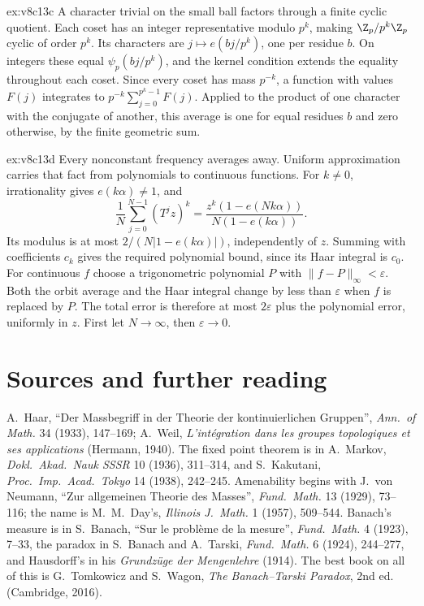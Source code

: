 \begin{solution}{ex:v8c13c}
\idea A character trivial on the small ball factors through a finite cyclic quotient.
\writeup Each coset has an integer representative modulo $p^k$, making $\Z_p/p^k\Z_p$ cyclic of order $p^k$. Its characters are $j\mapsto e(bj/p^k)$, one per residue $b$. On integers these equal $\psi_p(bj/p^k)$, and the kernel condition extends the equality throughout each coset. Since every coset has mass $p^{-k}$, a function with values $F(j)$ integrates to $p^{-k}\sum_{j=0}^{p^k-1}F(j)$. Applied to the product of one character with the conjugate of another, this average is one for equal residues $b$ and zero otherwise, by the finite geometric sum.
\end{solution}
\begin{solution}{ex:v8c13d}
\idea Every nonconstant frequency averages away. Uniform approximation carries that fact from polynomials to continuous functions.
\writeup For $k\ne0$, irrationality gives $e(k\alpha)\ne1$, and
\[\frac1N\sum_{j=0}^{N-1}(T^jz)^k
 =\frac{z^k(1-e(Nk\alpha))}{N(1-e(k\alpha))}.
\]
Its modulus is at most $2/(N|1-e(k\alpha)|)$, independently of $z$. Summing with coefficients $c_k$ gives the required polynomial bound, since its Haar integral is $c_0$. For continuous $f$ choose a trigonometric polynomial $P$ with $\|f-P\|_\infty<\varepsilon$. Both the orbit average and the Haar integral change by less than $\varepsilon$ when $f$ is replaced by $P$. The total error is therefore at most $2\varepsilon$ plus the polynomial error, uniformly in $z$. First let $N\to\infty$, then $\varepsilon\to0$.
\end{solution}

\section*{Sources and further reading}

A.~Haar, ``Der Massbegriff in der Theorie der kontinuierlichen Gruppen'', \emph{Ann.\ of Math.} 34 (1933), 147--169; A.~Weil, \emph{L'int\'egration dans les groupes topologiques
et ses applications} (Hermann, 1940). The fixed point theorem is in A.~Markov, \emph{Dokl.\ Akad.\ Nauk SSSR} 10 (1936), 311--314, and S.~Kakutani, \emph{Proc.\ Imp.\ Acad.\ Tokyo} 14
(1938), 242--245. Amenability begins with J.~von Neumann, ``Zur allgemeinen Theorie des Masses'', \emph{Fund.\ Math.} 13 (1929), 73--116; the name is M.~M.~Day's, \emph{Illinois J.\
Math.} 1 (1957), 509--544. Banach's measure is in S.~Banach, ``Sur le probl\`eme de la mesure'', \emph{Fund.\ Math.} 4 (1923), 7--33, the paradox in S.~Banach and A.~Tarski, \emph{Fund.\
Math.} 6 (1924), 244--277, and Hausdorff's in his \emph{Grundz\"uge der Mengenlehre} (1914). The best book on all of this is G.~Tomkowicz and S.~Wagon, \emph{The Banach--Tarski
Paradox}, 2nd ed. (Cambridge, 2016).

